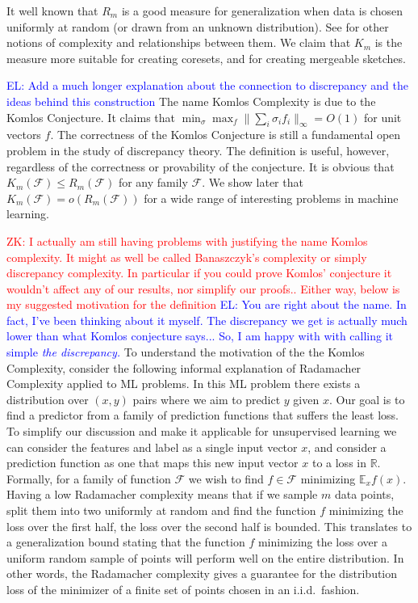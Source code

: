 \documentclass[anon,12pt]{colt2019} %
\newcommand{\zk}[1]{\textcolor{red}{ZK: #1}}
\newcommand{\el}[1]{\textcolor{blue}{EL: #1}}
\newcommand{\R}{\mathbb{R}}
\newcommand{\E}{\mathbb{E}}
\newcommand{\F}{\mathcal{F}}
\begin{document}
\noindent It well known that $R_m$ is a good measure for generalization when data is chosen uniformly at random (or drawn from an unknown distribution). See \cite{Bartlett:2003:RGC:944919.944944} for other notions of complexity and relationships between them. We claim that $K_m$ is the measure more suitable for creating coresets, and for creating mergeable sketches.


\el{Add a much longer explanation about the connection to discrepancy and the ideas behind this construction} The name Komlos Complexity is due to the Komlos Conjecture. It claims that $\min_\sigma \max_f \|\sum_i \sigma_i f_i\|_\infty = O(1)$ for unit vectors $f$. The correctness of the Komlos Conjecture is still a fundamental open problem in the study of discrepancy theory.  The definition is useful, however, regardless of the correctness or provability of the conjecture.  
It is obvious that  $K_m(\F) \le R_m(\F)$ for any family $\F$. We show later that $K_m(\F) = o(R_m(\F))$ for a wide range of interesting problems in machine learning.

 \zk{I actually am still having problems with justifying the name Komlos complexity. It might as well be called Banaszczyk's complexity or simply discrepancy complexity. In particular if you could prove Komlos' conjecture it wouldn't affect any of our results, nor simplify our proofs.. Either way, below is my suggested motivation for the definition}
 \el{You are right about the name. In fact, I've been thinking about it myself. The discrepancy we get is actually much lower than what Komlos conjecture says... So, I am happy with with calling it simple \it{the discrepancy.}}
To understand the motivation of the the Komlos Complexity, consider the following informal explanation of Radamacher Complexity applied to ML problems. In this ML problem there exists a distribution over $(x,y)$ pairs where we aim to predict $y$ given $x$. Our goal is to find a predictor from a family of prediction functions that suffers the least loss.  To simplify our discussion and make it applicable for unsupervised learning we can consider the features and label as a single input vector $x$, and consider a prediction function as one that maps this new input vector $x$ to a loss in $\R$. Formally, for a family of function $\F$ we wish to find $f \in \F$ minimizing $\E_x f(x)$. Having a low Radamacher complexity means that if we sample $m$ data points, split them into two uniformly at random and find the function $f$ minimizing the loss over the first half, the loss over the second half is bounded. This translates to a generalization bound stating that the function $f$ minimizing the loss over a uniform random sample of points will perform well on the entire distribution. In other words, the Radamacher complexity gives a guarantee for the distribution loss of the minimizer of a finite set of points chosen in an i.i.d.\ fashion. 
\end{document}
